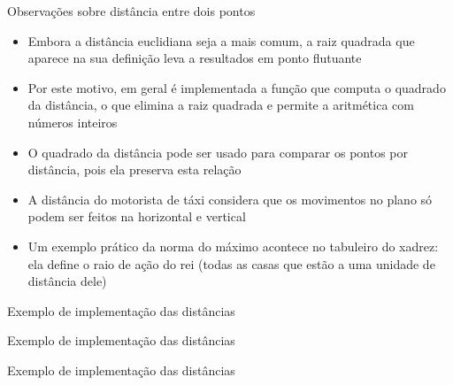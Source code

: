 \begin{frame}[fragile]{Observações sobre distância entre dois pontos}

    \begin{itemize}
        \item Embora a distância euclidiana seja a mais comum, a raiz quadrada que aparece na
            sua definição leva a resultados em ponto flutuante
        \pause

        \item Por este motivo, em geral é implementada a função que computa o quadrado da
            distância, o que elimina a raiz quadrada e permite a aritmética com números inteiros
        \pause

        \item O quadrado da distância pode ser usado para comparar os pontos por distância, pois
            ela preserva esta relação
        \pause

        \item A distância do motorista de táxi considera que os movimentos no plano só podem ser
            feitos na horizontal e vertical
        \pause

        \item Um exemplo prático da norma do máximo acontece no tabuleiro do xadrez: ela define o
            raio de ação do rei (todas as casas que estão a uma unidade de distância dele)
    \end{itemize}

\end{frame}

\begin{frame}[fragile]{Exemplo de implementação das distâncias}
\end{frame}

\begin{frame}[fragile]{Exemplo de implementação das distâncias}
\end{frame}

\begin{frame}[fragile]{Exemplo de implementação das distâncias}
\end{frame}
